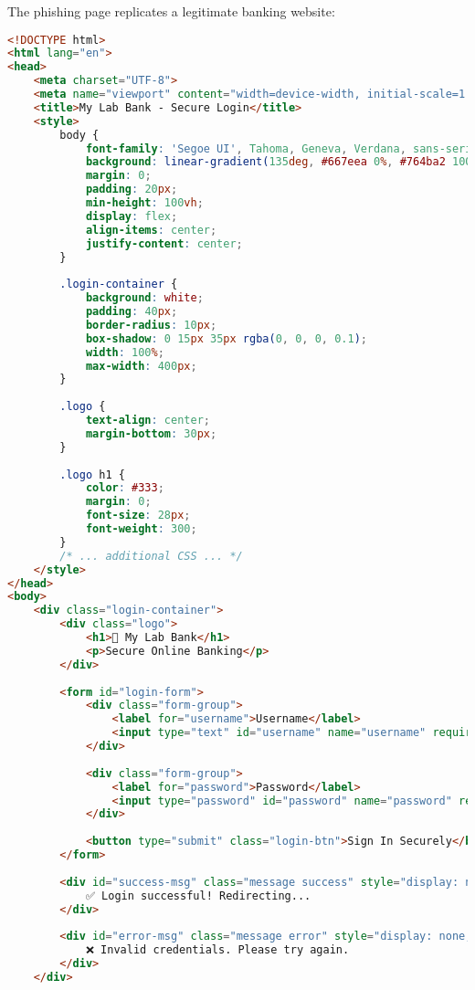 \documentclass[12pt,a4paper]{article}
\begin{document}
The phishing page replicates a legitimate banking website:

\begin{lstlisting}[language=html, caption=Phishing Page HTML Structure]
<!DOCTYPE html>
<html lang="en">
<head>
    <meta charset="UTF-8">
    <meta name="viewport" content="width=device-width, initial-scale=1.0">
    <title>My Lab Bank - Secure Login</title>
    <style>
        body {
            font-family: 'Segoe UI', Tahoma, Geneva, Verdana, sans-serif;
            background: linear-gradient(135deg, #667eea 0%, #764ba2 100%);
            margin: 0;
            padding: 20px;
            min-height: 100vh;
            display: flex;
            align-items: center;
            justify-content: center;
        }
        
        .login-container {
            background: white;
            padding: 40px;
            border-radius: 10px;
            box-shadow: 0 15px 35px rgba(0, 0, 0, 0.1);
            width: 100%;
            max-width: 400px;
        }
        
        .logo {
            text-align: center;
            margin-bottom: 30px;
        }
        
        .logo h1 {
            color: #333;
            margin: 0;
            font-size: 28px;
            font-weight: 300;
        }
        /* ... additional CSS ... */
    </style>
</head>
<body>
    <div class="login-container">
        <div class="logo">
            <h1>🏦 My Lab Bank</h1>
            <p>Secure Online Banking</p>
        </div>
        
        <form id="login-form">
            <div class="form-group">
                <label for="username">Username</label>
                <input type="text" id="username" name="username" required>
            </div>
            
            <div class="form-group">
                <label for="password">Password</label>
                <input type="password" id="password" name="password" required>
            </div>
            
            <button type="submit" class="login-btn">Sign In Securely</button>
        </form>
        
        <div id="success-msg" class="message success" style="display: none;">
            ✅ Login successful! Redirecting...
        </div>
        
        <div id="error-msg" class="message error" style="display: none;">
            ❌ Invalid credentials. Please try again.
        </div>
    </div>
\end{lstlisting}
\end{document}
